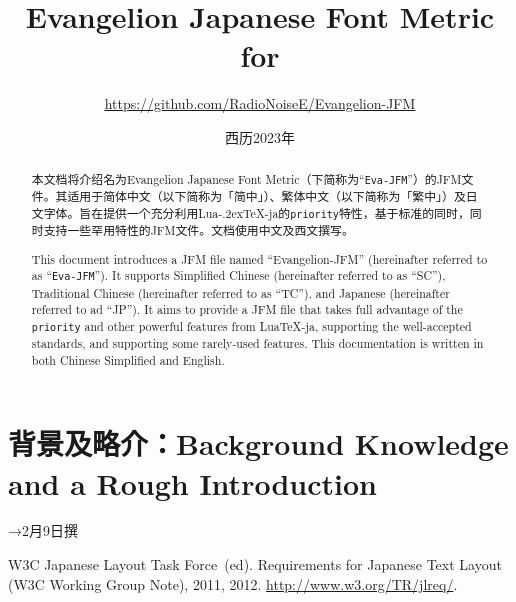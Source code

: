 \documentclass[
    paper = a4paper,
    fontsize = 12Q,
    jafontsize = 12Q,
    article
]{jlreq}
\title{\sffamily Evangelion Japanese Font Metric for \LuaTeX}
\author{\large \url{https://github.com/RadioNoiseE/Evangelion-JFM}}
\date{西历2023年}
\def\段{\par}
\def\LuaTeX{Lua\kern-.2ex\TeX}
\begin{document}
\zw

\maketitle

\begin{abstract}
    本文档将介绍名为Evangelion Japanese Font Metric（下简称为``\lstinline|Eva-JFM|''）的JFM文件。其适用于简体中文（以下简称为「简中」）、繁体中文（以下简称为「繁中」）及日文字体。旨在提供一个充分利用\LuaTeX{}-ja的\lstinline|priority|特性，基于标准\cite{jlreq}的同时，同时支持一些罕用特性的JFM文件。文档使用中文及西文撰写。\段
    This document introduces a JFM file named ``Evangelion-JFM'' (hereinafter referred to as ``\lstinline{Eva-JFM}''). It supports Simplified Chinese (hereinafter referred to as ``SC''), Traditional Chinese (hereinafter referred to as ``TC''), and Japanese (hereinafter referred to ad ``JP''). It aims to provide a JFM file that takes full advantage of the \lstinline|priority| and other powerful features from LuaTeX-ja, supporting the well-accepted standards\cite{jlreq}, and supporting some rarely-used features. This documentation is written in both Chinese Simplified and English.
\end{abstract}

\section{背景及略介：Background Knowledge and a Rough Introduction}
→2月9日撰

\begin{thebibliography}{99}
     W3C Japanese Layout Task Force~(ed). \newblock Requirements for Japanese Text Layout (W3C Working Group Note), 2011, 2012. \newblock \url{http://www.w3.org/TR/jlreq/}.
\end{thebibliography}
\end{document}

